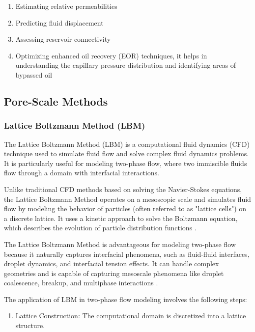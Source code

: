 {		\begin{enumerate}
			\item Estimating relative permeabilities
			
			\item Predicting fluid displacement
			
			\item Assessing reservoir connectivity
			
			\item Optimizing enhanced oil recovery (EOR) techniques, it helps in understanding the capillary pressure distribution and identifying areas of bypassed oil
			
		\end{enumerate}
		
\subsection{Pore-Scale Methods}
	\subsubsection{Lattice Boltzmann Method (LBM)}
		The Lattice Boltzmann Method (LBM) is a computational fluid dynamics (CFD) technique used to simulate fluid flow and solve complex fluid dynamics problems. It is particularly useful for modeling two-phase flow, where two immiscible fluids flow through a domain with interfacial interactions.
		
		Unlike traditional CFD methods based on solving the Navier-Stokes equations, the Lattice Boltzmann Method operates on a mesoscopic scale and simulates fluid flow by modeling the behavior of particles (often referred to as "lattice cells") on a discrete lattice. It uses a kinetic approach to solve the Boltzmann equation, which describes the evolution of particle distribution functions \cite{aidun2010lattice}.
		
		The Lattice Boltzmann Method is advantageous for modeling two-phase flow because it naturally captures interfacial phenomena, such as fluid-fluid interfaces, droplet dynamics, and interfacial tension effects. It can handle complex geometries and is capable of capturing mesoscale phenomena like droplet coalescence, breakup, and multiphase interactions \cite{yudistiawan2009higher}.
	
		The application of LBM in two-phase flow modeling involves the following steps:
		
		\begin{enumerate}
			\item Lattice Construction: The computational domain is discretized into a lattice structure.
			

\end{enumerate}}
